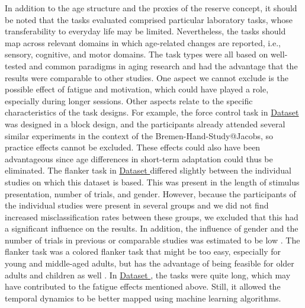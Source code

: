 In addition to the age structure and the proxies of the reserve concept, it should be noted that the tasks evaluated comprised particular laboratory tasks, whose transferability to everyday life may be limited. Nevertheless, the tasks should map across relevant domains in which age-related changes are reported, i.e., sensory, cognitive, and motor domains. The task types were all based on well-tested and common paradigms in aging research and had the advantage that the results were comparable to other studies. One aspect we cannot exclude is the possible effect of fatigue and motivation, which could have played a role, especially during longer sessions. Other aspects relate to the specific characteristics of the task designs. For example, the force control task in \hyperref[methods:datasets:I]{Dataset } was designed in a block design, and the participants already attended several similar experiments in the context of the Bremen-Hand-Study@Jacobs, so practice effects cannot be excluded. These effects could also have been advantageous since age differences in short-term adaptation could thus be eliminated. The flanker task in \hyperref[methods:datasets:II]{Dataset } differed slightly between the individual studies on which this dataset is based. This was present in the length of stimulus presentation, number of trials, and gender. However, because the participants of the individual studies were present in several groups and we did not find increased misclassification rates between these groups, we excluded that this had a significant influence on the results. In addition, the influence of gender and the number of trials in previous or comparable studies was estimated to be low \cite{Reuter2019, Vahid2020}. The flanker task was a colored flanker task that might be too easy, especially for young and middle-aged adults, but has the advantage of being feasible for older adults and children as well \cite{Reuter2019}. In \hyperref[methods:datasets:III]{Dataset }, the tasks were quite long, which may have contributed to the fatigue effects mentioned above. Still, it allowed the temporal dynamics to be better mapped using machine learning algorithms.

